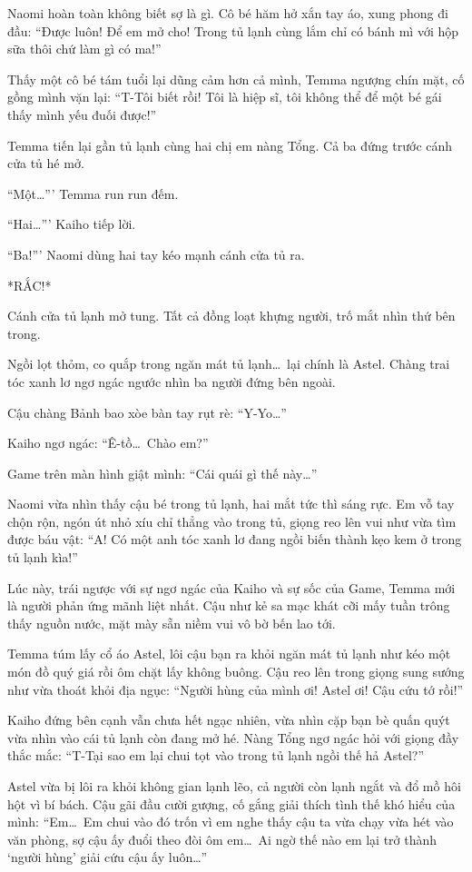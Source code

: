 \documentclass[../main.tex]{subfiles}
\begin{document}
Naomi hoàn toàn không biết sợ là gì. Cô bé hăm hở xắn tay áo, xung phong đi đầu: ``Được luôn! Để em mở cho! Trong tủ lạnh cùng lắm chỉ có bánh mì với hộp sữa thôi chứ làm gì có ma!''

Thấy một cô bé tám tuổi lại dũng cảm hơn cả mình, Temma ngượng chín mặt, cố gồng mình vặn lại: ``T-Tôi biết rồi! Tôi là hiệp sĩ, tôi không thể để một bé gái thấy mình yếu đuối được!''

Temma tiến lại gần tủ lạnh cùng hai chị em nàng Tổng. Cả ba đứng trước cánh cửa tủ hé mở.

``Một\dots''' Temma run run đếm.

``Hai\dots''' Kaiho tiếp lời.

``Ba!''' Naomi dùng hai tay kéo mạnh cánh cửa tủ ra.

*RẮC!*

Cánh cửa tủ lạnh mở tung. Tất cả đồng loạt khựng người, trố mắt nhìn thứ bên trong.

Ngồi lọt thỏm, co quắp trong ngăn mát tủ lạnh\dots\ lại chính là Astel. Chàng trai tóc xanh lơ ngơ ngác ngước nhìn ba người đứng bên ngoài.


Cậu chàng Bảnh bao xòe bàn tay rụt rè: ``Y-Yo\dots''

Kaiho ngơ ngác: ``Ê-tồ\dots\ Chào em?''

Game trên màn hình giật mình: ``Cái quái gì thế này\dots''

Naomi vừa nhìn thấy cậu bé trong tủ lạnh, hai mắt tức thì sáng rực. Em vỗ tay chộn rộn, ngón út nhỏ xíu chỉ thẳng vào trong tủ, giọng reo lên vui như vừa tìm được báu vật: ``A! Có một anh tóc xanh lơ đang ngồi biến thành kẹo kem ở trong tủ lạnh kìa!''

Lúc này, trái ngược với sự ngơ ngác của Kaiho và sự sốc của Game, Temma mới là người phản ứng mãnh liệt nhất. Cậu như kẻ sa mạc khát cỡi mấy tuần trông thấy nguồn nước, mặt mày sẵn niềm vui vô bờ bến lao tới.

Temma túm lấy cổ áo Astel, lôi cậu bạn ra khỏi ngăn mát tủ lạnh như kéo một món đồ quý giá rồi ôm chặt lấy không buông. Cậu reo lên trong giọng sung sướng như vừa thoát khỏi địa ngục: ``Người hùng của mình ơi! Astel ơi! Cậu cứu tớ rồi!''

Kaiho đứng bên cạnh vẫn chưa hết ngạc nhiên, vừa nhìn cặp bạn bè quấn quýt vừa nhìn vào cái tủ lạnh còn đang mở hé. Nàng Tổng ngơ ngác hỏi với giọng đầy thắc mắc: ``T-Tại sao em lại chui tọt vào trong tủ lạnh ngồi thế hả Astel?''

Astel vừa bị lôi ra khỏi không gian lạnh lẽo, cả người còn lạnh ngắt và đổ mồ hôi hột vì bí bách. Cậu gãi đầu cười gượng, cố gắng giải thích tình thế khó hiểu của mình: ``Em\dots\ Em chui vào đó trốn vì em nghe thấy cậu ta vừa chạy vừa hét vào văn phòng, sợ cậu ấy đuổi theo đòi ôm em\dots\ Ai ngờ thế nào em lại trở thành `người hùng' giải cứu cậu ấy luôn\dots''
\end{document}

